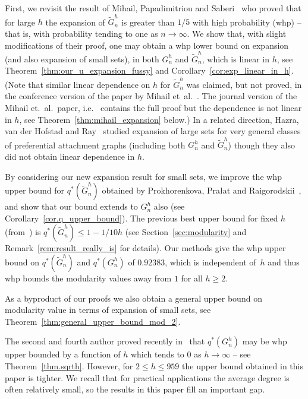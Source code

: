 \documentclass[runningheads, envcountsame, smallextended]{llncs}
\newcommand{\q}{q^*}
\numberwithin{theorem}{section}
\numberwithin{definition}{section}
\numberwithin{lemma}{section}
\numberwithin{corollary}{section}
\numberwithin{proposition}{section}
\numberwithin{conjecture}{section}
\numberwithin{remark}{section}
\numberwithin{equation}{section}
\begin{document}
First, we revisit the result of Mihail, Papadimitriou and Saberi~\cite{mihail2006journal} who proved that for large $h$ the expansion of $\tilde{G}_n^h$ is greater than $1/5$ with high probability (whp) -- that is, with probability tending to one as $n \to \infty$. 
%
We show that, with slight modifications of their proof, one may obtain a whp lower bound on expansion (and also expansion of small sets), in both $G_n^h$ and $\tilde{G}_n^h$, which is linear in $h$, see Theorem~\ref{thm:our_u_expansion_fussy} and Corollary~\ref{cor:exp_linear_in_h}. 
(Note that similar linear dependence on $h$ for $\tilde{G}_n^h$ was claimed, but not proved, in the conference version of the paper by Mihail et~al.~\cite{mihail2003conf}. The journal version of the Mihail et.~al.~paper, i.e.~\cite{mihail2006journal} contains the full proof but the dependence is not linear in $h$, see Theorem~\ref{thm:mihail_expansion} below.) In a related direction, Hazra, van der Hofstad and Ray~\cite{hazra2023percolation} studied expansion of large sets for very general classes of preferential attachment graphs (including both $G_n^h$ and $\tilde{G}_n^h$) though they also did not obtain linear dependence in $h$.



By considering our new expansion result for small sets, we improve the whp upper bound for $q^*(\tilde{G}_n^h)$ obtained by Prokhorenkova, Pra\l at and Raigorodskii~\cite{prokhorenkova2017modularity_internet_Math}, and show that our bound extends to $G_n^h$ also (see Corollary~\ref{cor.q_upper_bound}). The previous best upper bound for fixed $h$ (from~\cite{prokhorenkova2017modularity_internet_Math}) is $\q(\tilde{G}_n^h) \leq 1-1/10h$ (see Section~\ref{sec:modularity} and Remark~\ref{rem:result_really_is} for details). Our methods give the whp upper bound on $\q(\tilde{G}_n^h)$ and $\q(G_n^h)$ of $0.92383$, which is independent of~$h$ and thus whp bounds the modularity values away from $1$ for all $h \geq 2$.
 
 As a byproduct of our proofs we also obtain a general upper bound on modularity value in terms of expansion of small sets, see 
 Theorem~\ref{thm:general_upper_bound_mod_2}. 
 
 
The second and fourth author proved recently in~\cite{rybarczyk2025modularity} that $q^*(G_n^h)$ may be whp upper bounded by a function of $h$ which tends to $0$ as $h \rightarrow \infty$ -- see Theorem~\ref{thm.sqrth}. However, for $2 \leq h \leq 959$ 
the upper bound obtained in this paper is tighter. 
We recall that for practical applications the average degree is often relatively small, so the results in this paper fill an important gap.
\end{document}

